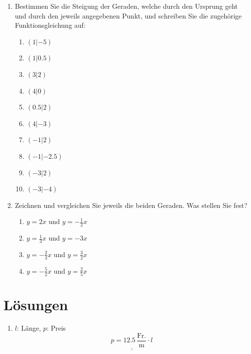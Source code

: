 \documentclass[%
11pt,%
twoside,%
titlepage,%
german,%
headsepline%
]{scrartcl}
\newcommand{\ufrac}[2]{\ensuremath{\,\frac{\mathrm{#1}}{\mathrm{#2}}}}
\newcommand{\result}[1]{\underline{\underline{#1}}}
\begin{document}
{{\begin{enumerate}
\item Bestimmen Sie die Steigung der Geraden, welche durch den Ursprung geht und durch den jeweils angegebenen Punkt, und schreiben Sie die zugeh\"orige Funktionsgleichung auf:
  \begin{enumerate}
  \item $(1|-5)$
  \item $(1|0.5)$
  \item $(3|2)$
  \item $(4|0)$
  \item $(0.5|2)$
  \item $(4|-3)$
  \item $(-1|2)$
  \item $(-1|-2.5)$
  \item $(-3|2)$
  \item $(-3|-4)$
  \end{enumerate}


\item Zeichnen und vergleichen Sie jeweils die beiden Geraden. Was stellen Sie fest?
  \begin{enumerate}
  \item $y=2x$ und $y=-\frac{1}{2}x$
  \item $y=\frac{1}{3}x$ und $y=-3x$
  \item $y=-\frac{2}{3}x$ und $y=\frac{3}{2}x$
  \item $y=-\frac{5}{2}x$ und $y=\frac{2}{5}x$
  \end{enumerate}

\end{enumerate}}


\section*{L\"osungen}
{\settowidth{\labelwidth}{L9.9}
\setlength{\leftmargini}{\labelwidth} \addtolength{\leftmargini}{\labelsep}
\renewcommand{\labelenumi}{L\thesection.\arabic{enumi}}
\begin{enumerate}

\item $l$: L\"ange, $p$: Preis
  \begin{displaymath}
    \result{p=12.5\ufrac{Fr.}{m} \cdot l}
  \end{displaymath}


\end{enumerate}}}
\end{document}
